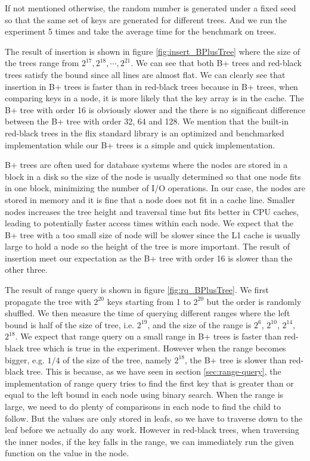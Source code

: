 \documentclass[twoside,11pt]{report}
\theoremstyle{definition}
\begin{document}
If not mentioned otherwise, the random number is generated under a fixed seed so that the same set of keys are generated for different trees. And we run the experiment 5 times and take the average time for the benchmark on trees.

The result of insertion is shown in figure \ref{fig:insert_BPlusTree} where the size of the trees range from $2^{17}, 2^{18}, \cdots, 2^{21}$. We can see that both B+ trees and red-black trees satisfy the bound since all lines are almost flat. We can clearly see that insertion in B+ trees is faster than in red-black trees because in B+ trees, when comparing keys in a node, it is more likely that the key array is in the cache. The B+ tree with order 16 is obviously slower and the there is no significant difference between the B+ tree with order 32, 64 and 128. We mention that the built-in red-black trees in the flix standard library is an optimized and benchmarked implementation while our B+ trees is a simple and quick implementation.

B+ trees are often used for database systems where the nodes are stored in a block in a disk so the size of the node is usually determined so that one node fits in one block, minimizing the number of I/O operations. In our case, the nodes are stored in memory and it is fine that a node does not fit in a cache line. Smaller nodes increases the tree height and traversal time but fits better in CPU caches, leading to potentially faster access times within each node. We expect that the B+ tree with a too small size of node will be slower since the L1 cache is usually large to hold a node so the height of the tree is more important. The result of insertion meet our expectation as the B+ tree with order 16 is slower than the other three.

The result of range query is shown in figure \ref{fig:rq_BPlusTree}. We first propagate the tree with $2^{20}$ keys starting from 1 to $2^{20}$ but the order is randomly shuffled. We then measure the time of querying different ranges where the left bound is half of the size of tree, i.e. $2^{19}$, and the size of the range is $2^6$, $2^10$, $2^{14}$, $2^{18}$. We expect that range query on a small range in B+ trees is faster than red-black tree which is true in the experiment. However when the range becomes bigger, e.g. $1/4$ of the size of the tree, namely $2^{18}$, the B+ tree is slower than red-black tree. This is because, as we have seen in section \ref{sec:range-query}, the implementation of range query tries to find the first key that is greater than or equal to the left bound in each node using binary search. When the range is large, we need to do plenty of comparisons in each node to find the child to follow. But the values are only stored in leafs, so we have to traverse down to the leaf before we actually do any work. However in red-black trees, when traversing the inner nodes, if the key falls in the range, we can immediately run the given function on the value in the node.
\end{document}
